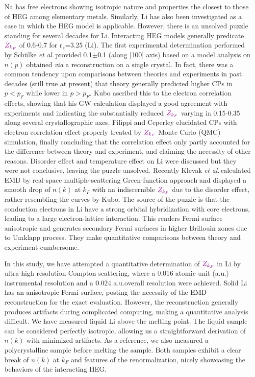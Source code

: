 \documentclass[twocolumn,showpacs,showkeys,fleqn,prl,superscriptaddress]{revtex4}%
\newcommand{\ii}[1]{\textit{#1}}
\begin{document}
Na has free electrons showing isotropic nature and properties the closest to those of HEG among elementary metals.
Similarly, Li has also been investigated as a case in which the HEG model is applicable.
However, there is an unsolved puzzle standing for several decades for Li. 
Interacting HEG models generally predicate ${\color{violet}Z_{k_F}}$ of 0.6-0.7 for r$_s$=3.25 (Li).
The first experimental determination performed by Sch{\"u}lke \ii{et al.}\,provided 0.1$\pm$0.1 (along [100] axis) based on a model analysis on $n(p)$ obtained \ii{via} a reconstruction on a single crystal\cite{schulke96}. 
In fact, there was a common tendency upon comparisons between theories and experiments in past decades (still true at present) that theory generally predicted higher CPs in $p<p_F$ while lower in $p>p_F$\cite{saku95}. 
Kubo ascribed this to the electron correlation effects, showing that his GW calculation displayed a good agreement with experiments and indicating the substantially reduced ${\color{violet}Z_{k_F}}$ varying in 0.15-0.35 along several crystallographic axes\cite{kubo95,kubo97}.
Filippi and Ceperley elucidated CPs with {\color{violet}electron} correlation effect properly treated by ${\color{violet}Z_{k_F}}$ Monte Carlo (QMC) simulation, finally concluding that the correlation effect only partly accounted for the difference between theory and experiment, and claiming the necessity of other reasons\cite{filippi99}.  
Disorder effect\cite{dugdale98} and temperature effect on Li\cite{stern01} were discussed but they were not conclusive, leaving the puzzle unsolved.
Recently Klevak \ii{et al.}\,calculated EMD by real-space multiple-scattering Green-function approach and displayed a smooth drop of $n(k)$ at $k_F$ with an indiscernible ${\color{violet}Z_{k_F}}$ due to the disorder effect, rather resembling the curves by Kubo\cite{klevak16}.  
The source of the puzzle is that the conduction electrons in Li have a strong orbital hybridization with core electrons, leading to a large electron-lattice interaction.
This renders Fermi surface anisotropic and generates secondary Fermi surfaces in higher Brillouin zones due to Umklapp process.
They make quantitative comparisons between theory and experiment cumbersome. 

In this study, we have attempted a quantitative determination of ${\color{violet}Z_{k_F}}$ in Li by ultra-high resolution Compton scattering, where a 0.016 atomic unit (a.u.) instrumental resolution and a 0.024 a.u.\;overall resolution were achieved.
Solid Li has an anisotropic Fermi surface, posting the necessity of the EMD reconstruction for the exact evaluation. 
However, the reconstruction generally produces artifacts during complicated computing, making a quantitative analysis difficult.
We have measured liquid Li above the melting point.
The liquid sample can be considered perfectly isotropic, allowing us a straightforward derivation of $n(k)$ with minimized artifacts.
As a reference, we also measured a polycrystalline sample before melting the sample.
Both samples exhibit a clear break of $n(k)$ at $k_F$ and features of the renormalization, nicely showcasing the behaviors of the interacting HEG\cite{holz11}.
\end{document}
